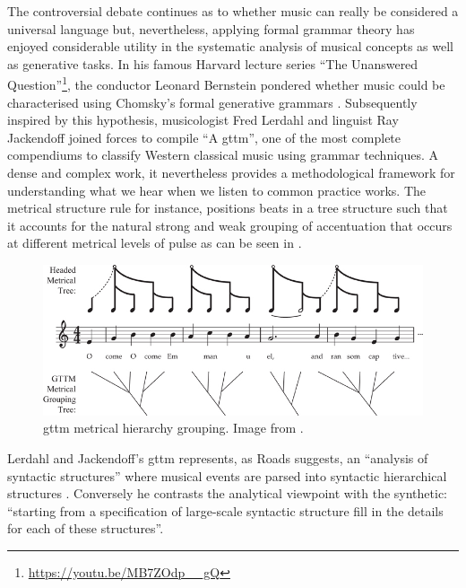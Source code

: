 The controversial debate continues as to whether music can really be considered a universal language \citep{Campbell1997, Savage2015} but, nevertheless, applying formal grammar theory has enjoyed considerable utility in the systematic analysis of musical concepts as well as generative tasks. In his famous Harvard lecture series ``The Unanswered Question''\footnote{\url{https://youtu.be/MB7ZOdp__gQ}}\citep{bernstein}, the conductor Leonard Bernstein pondered whether music could be characterised using Chomsky’s formal generative grammars \citep{Chomsky1957}. Subsequently inspired by this hypothesis, musicologist Fred Lerdahl and linguist Ray Jackendoff \citeyearpar{lerdahljackendoff} joined forces to compile ``A \acrfull{gttm}'', one of the most complete compendiums to classify Western classical music using grammar techniques. A dense and complex work, it nevertheless provides a methodological framework for understanding what we hear when we listen to common practice works. The metrical structure rule for instance, positions beats in a tree structure such that it accounts for the natural strong and weak grouping of accentuation that occurs at different metrical levels of pulse as can be seen in .

\begin{figure}
	\begin{center}
		\includegraphics[width=\figSizeHundred]{ch03_symbolic/figures/metricalhierarchy.jpg}
	\end{center}
	\caption[Generative Theory of Tonal Music Metrical hierarchy grouping]{\acrshort{gttm} metrical hierarchy grouping. Image from \cite{Fitch2013}.}
	\label{fig:gttm}
\end{figure}

Lerdahl and Jackendoff’s \acrshort{gttm} represents, as Roads suggests, an “analysis of syntactic structures” where musical events are parsed into syntactic hierarchical structures \citep{Roads1996}. Conversely he contrasts the analytical viewpoint with the synthetic: “starting from a specification of large-scale syntactic structure fill in the details for each of these structures”.

